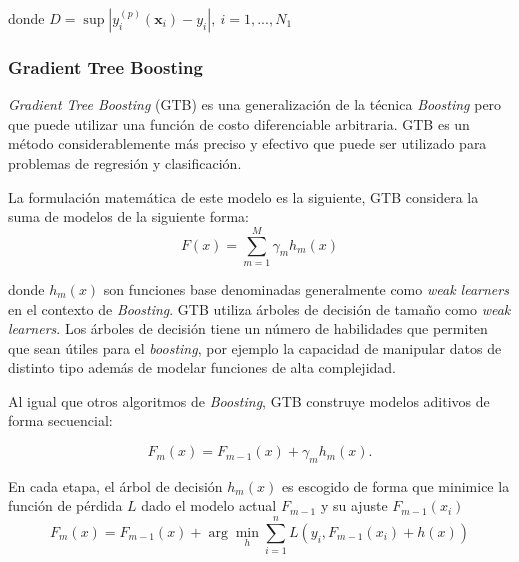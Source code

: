 \documentclass[spanish]{article}
\begin{document}
                donde $D=\sup|y_i^{(p)}(\textbf{x}_i)-y_i|, ~ i=1, ..., N_1$
                
            
            \subsubsection{Gradient Tree Boosting}
            
                \emph{Gradient Tree Boosting} (GTB) es una generalización de la técnica \emph{Boosting} pero que puede utilizar una función de costo
                diferenciable arbitraria. GTB es un método considerablemente más preciso y efectivo que puede ser utilizado para problemas de regresión
                y clasificación.
                
                La formulación matemática de este modelo es la siguiente, GTB considera la suma de modelos de la siguiente forma:
                \begin{equation}
                     F(x) = \sum_{m=1}^{M} \gamma_m h_m(x)
                \end{equation}
                
                donde $h_m(x)$ son funciones base denominadas generalmente como \emph{weak learners} en el contexto de \emph{Boosting}. GTB utiliza árboles
                de decisión de tamaño como \emph{weak learners}. Los árboles de decisión tiene un número de habilidades que permiten que sean útiles para 
                el \emph{boosting}, por ejemplo la capacidad de manipular datos de distinto tipo además de modelar funciones de alta complejidad.

                Al igual que otros algoritmos de \emph{Boosting}, GTB construye modelos aditivos de forma secuencial:
                
                \begin{equation}
                    F_m(x) = F_{m-1}(x) + \gamma_m h_m(x).
                \end{equation}
                 
                En cada etapa, el árbol de decisión $h_m(x)$ es escogido de forma que minimice la función de pérdida $L$ dado el modelo actual $F_{m-1}$ y
                su ajuste $F_{m-1}(x_i)$
                \begin{equation}
                    F_m(x) = F_{m-1}(x) + \arg\min_{h} \sum_{i=1}^{n} L(y_i, F_{m-1}(x_i) + h(x))
                \end{equation}
                 
\end{document}
